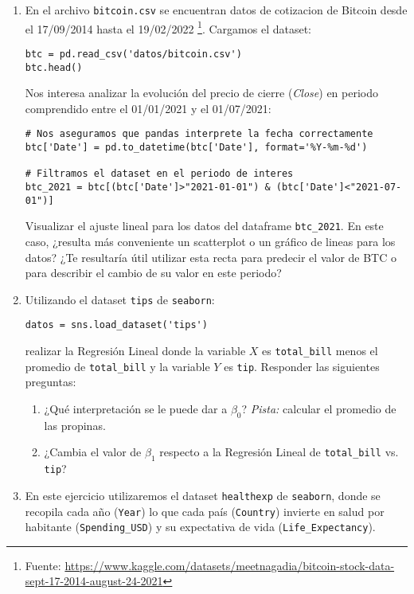 \documentclass[a4paper,11pt]{article}
\theoremstyle{definition}
\begin{document}
\begin{enumerate}[resume]
\begin{enumerate}
\end{enumerate}

\item En el archivo \texttt{bitcoin.csv} se encuentran datos de cotizacion de Bitcoin desde el 17/09/2014 hasta el 19/02/2022 \footnote{Fuente: \url{https://www.kaggle.com/datasets/meetnagadia/bitcoin-stock-data-sept-17-2014-august-24-2021}}. Cargamos el dataset:
\begin{lstlisting}
btc = pd.read_csv('datos/bitcoin.csv')
btc.head()
\end{lstlisting}
Nos interesa analizar la evolución del precio de cierre (\textit{Close}) en periodo comprendido entre el 01/01/2021 y el 01/07/2021:
\begin{lstlisting}
# Nos aseguramos que pandas interprete la fecha correctamente
btc['Date'] = pd.to_datetime(btc['Date'], format='%Y-%m-%d') 

# Filtramos el dataset en el periodo de interes
btc_2021 = btc[(btc['Date']>"2021-01-01") & (btc['Date']<"2021-07-01")]
\end{lstlisting}

Visualizar el ajuste lineal para los datos del dataframe \verb |btc_2021|. En este caso, ¿resulta más conveniente un scatterplot o un gráfico de lineas para los datos? ¿Te resultaría útil utilizar esta recta para predecir el valor de BTC o para describir el cambio de su valor en este periodo?


\item Utilizando el dataset \verb|tips| de \verb|seaborn|:
\begin{lstlisting}
datos = sns.load_dataset('tips')
\end{lstlisting}
realizar la Regresión Lineal donde la variable $X$ es \verb|total_bill| menos el promedio de \verb|total_bill| y la variable $Y$ es \verb|tip|. Responder las siguientes preguntas:
\begin{enumerate}
    \item ¿Qué interpretación se le puede dar a $\beta_0$? \textit{Pista:} calcular el promedio de las propinas.
    \item ¿Cambia el valor de $\beta_1$ respecto a la Regresión Lineal de \verb|total_bill| vs. \verb|tip|?
\end{enumerate}

\item En este ejercicio utilizaremos el dataset \verb|healthexp| de \verb|seaborn|, donde se recopila cada año (\verb|Year|) lo que cada país (\verb|Country|) invierte en salud por habitante (\verb|Spending_USD|) y su expectativa de vida (\verb|Life_Expectancy|). 


\end{enumerate}
\end{document}
